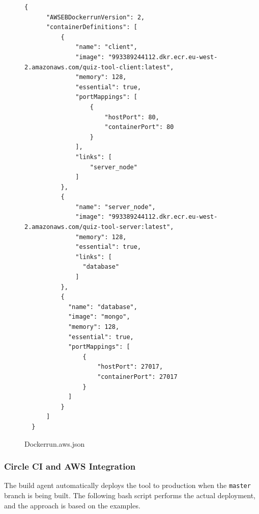 \begin{figure}[ht]
  \begin{lstlisting}[basicstyle=\tiny, breaklines=true]
  {
      "AWSEBDockerrunVersion": 2,
      "containerDefinitions": [
          {
              "name": "client",
              "image": "993389244112.dkr.ecr.eu-west-2.amazonaws.com/quiz-tool-client:latest",
              "memory": 128,
              "essential": true,
              "portMappings": [
                  {
                      "hostPort": 80,
                      "containerPort": 80
                  }
              ],
              "links": [
                  "server_node"
              ]
          },
          {
              "name": "server_node",
              "image": "993389244112.dkr.ecr.eu-west-2.amazonaws.com/quiz-tool-server:latest",
              "memory": 128,
              "essential": true,
              "links": [
                "database"
              ]
          },
          {
            "name": "database",
            "image": "mongo",
            "memory": 128,
            "essential": true,
            "portMappings": [
                {
                    "hostPort": 27017,
                    "containerPort": 27017
                }
            ]
          }
      ]
  }
  \end{lstlisting}
  \caption{Dockerrun.aws.json}
\end{figure}
\newpage

\subsubsection{Circle CI and AWS Integration}
The build agent automatically deploys the tool to production when the \texttt{master}
branch is being built. The following bash script performs the actual deployment, and the
approach is based on the examples\cite{41}\cite{42}.


